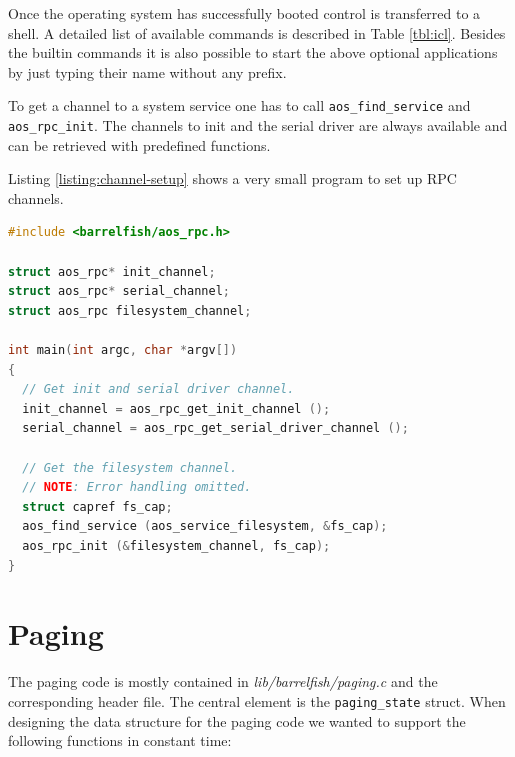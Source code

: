 \documentclass[a4paper,10pt]{article}
\newcommand{\filepath}[1]{\emph{ #1}}
\begin{document}
Once the operating system has successfully booted control is transferred to a shell.
A detailed list of available commands is described in Table \ref{tbl:icl}.
Besides the builtin commands it is also possible to start the above optional applications by just typing their name without any prefix.

To get a channel to a system service one has to call \lstinline!aos_find_service! and \lstinline!aos_rpc_init!.
The channels to init and the serial driver are always available and can be retrieved with predefined functions.

Listing \ref{listing:channel-setup} shows a very small program to set up RPC channels.

\begin{lstlisting}[language=C, caption={Setup code for channels.}, captionpos=b, label=listing:channel-setup]
#include <barrelfish/aos_rpc.h>

struct aos_rpc* init_channel;
struct aos_rpc* serial_channel;
struct aos_rpc filesystem_channel;

int main(int argc, char *argv[])
{
  // Get init and serial driver channel.
  init_channel = aos_rpc_get_init_channel ();
  serial_channel = aos_rpc_get_serial_driver_channel ();
  
  // Get the filesystem channel.
  // NOTE: Error handling omitted.
  struct capref fs_cap;
  aos_find_service (aos_service_filesystem, &fs_cap);
  aos_rpc_init (&filesystem_channel, fs_cap);
}
\end{lstlisting}

\section{Paging}

% 
% 
% 

The paging code is mostly contained in \filepath{lib/barrelfish/paging.c} and the corresponding header file.
The central element is the \lstinline!paging_state! struct.
When designing the data structure for the paging code we wanted to support the following functions in constant time:
\end{document}
